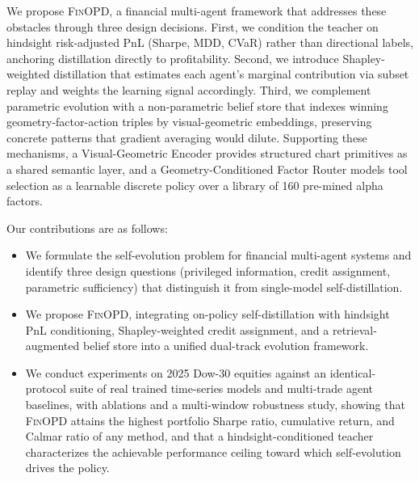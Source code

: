 We propose \textsc{FinOPD}, a financial multi-agent framework that addresses these obstacles through three design decisions. First, we condition the teacher on hindsight risk-adjusted PnL (Sharpe, MDD, CVaR) rather than directional labels, anchoring distillation directly to profitability. Second, we introduce Shapley-weighted distillation that estimates each agent's marginal contribution via subset replay and weights the learning signal accordingly. Third, we complement parametric evolution with a non-parametric belief store that indexes winning geometry-factor-action triples by visual-geometric embeddings, preserving concrete patterns that gradient averaging would dilute. Supporting these mechanisms, a Visual-Geometric Encoder provides structured chart primitives as a shared semantic layer, and a Geometry-Conditioned Factor Router models tool selection as a learnable discrete policy over a library of 160 pre-mined alpha factors.

Our contributions are as follows:
\begin{itemize}[leftmargin=*,nosep]
\item We formulate the self-evolution problem for financial multi-agent systems and identify three design questions (privileged information, credit assignment, parametric sufficiency) that distinguish it from single-model self-distillation.
\item We propose \textsc{FinOPD}, integrating on-policy self-distillation with hindsight PnL conditioning, Shapley-weighted credit assignment, and a retrieval-augmented belief store into a unified dual-track evolution framework.
\item We conduct experiments on 2025 Dow-30 equities against an identical-protocol suite of real trained time-series models and multi-trade agent baselines, with ablations and a multi-window robustness study, showing that \textsc{FinOPD} attains the highest portfolio Sharpe ratio, cumulative return, and Calmar ratio of any method, and that a hindsight-conditioned teacher characterizes the achievable performance ceiling toward which self-evolution drives the policy.
\end{itemize}
